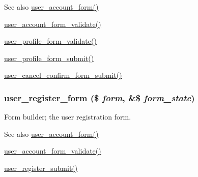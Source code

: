 \begin{DoxySeeAlso}{See also}
\hyperlink{user_8module_ab51965add9fd8ee2915e65d39213d05c}{user\_\-account\_\-form()} 

\hyperlink{user_8module_a168c461ed4da4e6a48458e68e7a85042}{user\_\-account\_\-form\_\-validate()} 

\hyperlink{user_8pages_8inc_afca5f516f0fadcb918e6d13dff66db76}{user\_\-profile\_\-form\_\-validate()} 

\hyperlink{user_8pages_8inc_ac10455f162f61cbf551fe7ec7b5c92cc}{user\_\-profile\_\-form\_\-submit()} 

\hyperlink{user_8pages_8inc_a44992d6b5034c5e58010d46316368308}{user\_\-cancel\_\-confirm\_\-form\_\-submit()} 
\end{DoxySeeAlso}
\hypertarget{group__forms_ga6dc04f116a25059727b3cf9e15205be8}{
\subsubsection[{user\_\-register\_\-form}]{\setlength{\rightskip}{0pt plus 5cm}user\_\-register\_\-form (\$ {\em form}, \/  \&\$ {\em form\_\-state})}}
\label{group__forms_ga6dc04f116a25059727b3cf9e15205be8}
Form builder; the user registration form.

\begin{DoxySeeAlso}{See also}
\hyperlink{user_8module_ab51965add9fd8ee2915e65d39213d05c}{user\_\-account\_\-form()} 

\hyperlink{user_8module_a168c461ed4da4e6a48458e68e7a85042}{user\_\-account\_\-form\_\-validate()} 

\hyperlink{user_8module_ad104f5427b9f52630164ef58808ad037}{user\_\-register\_\-submit()} 
\end{DoxySeeAlso}
